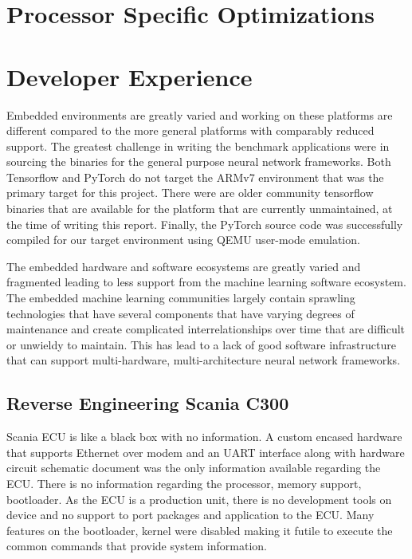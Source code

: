 
\section{Processor Specific Optimizations}

\section{Developer Experience}

Embedded environments are greatly varied and working on these platforms are different compared to the more general platforms with comparably reduced support. The greatest challenge in writing the benchmark applications were in sourcing the binaries for the general purpose neural network frameworks. Both Tensorflow and PyTorch do not target the ARMv7 environment that was the primary target for this project. There were are older community tensorflow binaries that are available for the platform that are currently unmaintained, at the time of writing this report. Finally, the PyTorch source code was successfully compiled for our target environment using QEMU user-mode emulation.

The embedded hardware and software ecosystems are greatly varied and fragmented leading to less support from the machine learning software ecosystem. The embedded machine learning communities largely contain sprawling technologies that have several components that have varying degrees of maintenance and create complicated interrelationships over time that are difficult or unwieldy to maintain. This has lead to a lack of good software infrastructure that can support multi-hardware, multi-architecture neural network frameworks.

\subsection{Reverse Engineering Scania C300}

Scania ECU is like a black box with no information. A custom encased hardware that supports Ethernet over modem and an UART interface along with hardware circuit schematic document was the only information available regarding the ECU. There is no information regarding the processor,  memory support, bootloader. As the ECU is a production unit, there is no development tools on device and no support to port packages and application to the ECU. Many features on the bootloader, kernel were disabled making it futile to execute the common commands that provide system information.


